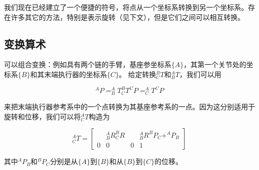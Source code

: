 
我们现在已经建立了一个便捷的符号，将点从一个坐标系转换到另一个坐标系。存在许多其它的方法，特别是表示旋转（见下文），但是它们之间可以相互转换。

\subsection{变换算术}

可以组合变换：例如具有两个链的手臂，基座参坐标系$ \{A \} $，其第一个关节处的坐标系$ \{B\} $和其末端执行器的坐标系$ \{C\} $。 给定转换$ ^ B_CT $和$ ^ A_BT $，我们可以用

\begin{equation}
^AP=^A_BT^B_CT^CP=^A_CT^CP
\end{equation}

来把末端执行器参考系中的一个点转换为其基座参考系的一点。因为这分别适用于旋转和位移，我们可以将$ ^A_CT $构造为

\begin{equation}
^A_CT=\left[\begin{array}{ccc|c} & ^A_BR^B_CR & & ^A_BR^BP_C +^AP_B \\\hline 0 & 0 & 0 & 1\end{array}\right]
\end{equation}
%

其中$ ^AP_B $和$ ^BP_C $分别是从$ \{A\} $到$ \{B\} $和从$ \{B\} $到$ \{C\} $的位移。

